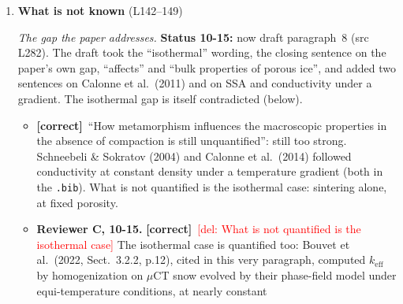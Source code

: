\documentclass[11pt]{article}
\newcommand{\Pg}[3]{\item \textbf{#1} {\small(#2)}\par\textit{#3}}
\newcommand{\tC}{\textcolor{miss}{\textbf{[correct]}}\ }
\newcommand{\tG}{\textcolor{stale}{\textbf{[wording]}}\ }
\newcommand{\add}[1]{\textcolor{revX}{#1}}
\newcommand{\del}[1]{\textcolor{red}{[del: #1]}}
\begin{document}
\begin{enumerate}
\begin{itemize}
    experiment parameterizing growth with temperature and saturation. It is
    a review of ice crystal growth (snow crystals in clouds, growth from
    liquid and vapor), not metamorphism; drop it from the DSM list. For the
    kinetics sentence cite the measurements, Libbrecht \& Rickerby (2013),
    with the review if wanted.
  \item \tC \textbf{Moure \& Fu (2024) is a wet-snow model} (``A Phase-Field
    Model for Wet Snow Metamorphism''); this paper uses its two-phase
    (ice--air) form. Say so, as Section~5 already does.
  \item \tG ``all stages DSM'': ``all stages of DSM''. ``in hopes better
    predict'': ``to better predict''. ``were the first to attempt to use'':
    ``were the first to use''. ``steady state'' (adjective):
    ``steady-state''.
  \end{itemize}
\Pg{What is not known}{L142--149}{The gap the paper addresses.}
  \add{\textbf{Status 10-15:} now draft paragraph~8 (src L282). The draft
  took the ``isothermal'' wording, the closing sentence on the paper's own
  gap, ``affects'' and ``bulk properties of porous ice'', and added two
  sentences on Calonne et al.\ (2011) and on SSA and conductivity under a
  gradient. The isothermal gap is itself contradicted (below).}
  \begin{itemize}
  \item \tC ``How metamorphism influences the macroscopic properties in the
    absence of compaction is still unquantified'': still too strong.
    Schneebeli \& Sokratov (2004) and Calonne et al.\ (2014) followed
    conductivity at constant density under a temperature gradient (both in
    the \texttt{.bib}). What is not quantified is the isothermal case:
    sintering alone, at fixed porosity.
  \item \add{\textbf{Reviewer C, 10-15.} \tC \del{What is not quantified is
    the isothermal case} The isothermal case is quantified too: Bouvet et
    al.\ (2022, Sect.~3.2.2, p.12), cited in this very paragraph, computed
    $k_{\mathrm{eff}}$ by homogenization on $\mu$CT snow evolved by their
    phase-field model under equi-temperature conditions, at nearly constant
}
\end{itemize}
\end{enumerate}
\end{document}
